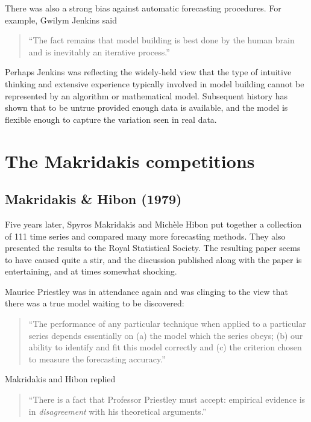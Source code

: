 \documentclass[11pt,a4paper,]{article}
\begin{document}
There was also a strong bias against automatic forecasting procedures. For example, Gwilym Jenkins said

\begin{quote}
``The fact remains that model building is best done by the human brain and is inevitably an iterative process.''
\end{quote}

Perhaps Jenkins was reflecting the widely-held view that the type of intuitive thinking and extensive experience typically involved in model building cannot be represented by an algorithm or mathematical model. Subsequent history has shown that to be untrue provided enough data is available, and the model is flexible enough to capture the variation seen in real data.

\hypertarget{the-makridakis-competitions}{%
\section{The Makridakis competitions}\label{the-makridakis-competitions}}

\hypertarget{makridakis-hibon-1979}{%
\subsection*{Makridakis \& Hibon (1979)}\label{makridakis-hibon-1979}}

Five years later, Spyros Makridakis and Michèle Hibon put together a collection of 111 time series and compared many more forecasting methods. They also presented the results to the Royal Statistical Society. The resulting paper \autocite{Makridakis1979} seems to have caused quite a stir, and the discussion published along with the paper is entertaining, and at times somewhat shocking.

Maurice Priestley was in attendance again and was clinging to the view that there was a true model waiting to be discovered:

\begin{quote}
``The performance of any particular technique when applied to a particular series depends essentially on (a) the model which the series obeys; (b) our ability to identify and fit this model correctly and (c) the criterion chosen to measure the forecasting accuracy.''
\end{quote}

Makridakis and Hibon replied

\begin{quote}
``There is a fact that Professor Priestley must accept: empirical evidence is in \emph{disagreement} with his theoretical arguments.''
\end{quote}
\end{document}
